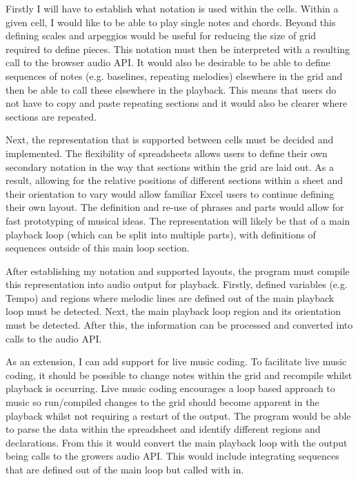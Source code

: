 \documentclass[]{article}
\begin{document}
Firstly I will have to establish what notation is used within the cells.
Within a given cell, I would like to be able to play single notes and
chords. Beyond this defining scales and arpeggios would be useful for
reducing the size of grid required to define pieces. This notation must
then be interpreted with a resulting call to the browser audio API. It
would also be desirable to be able to define sequences of notes (e.g.
baselines, repeating melodies) elsewhere in the grid and then be able to
call these elsewhere in the playback. This means that users do not have
to copy and paste repeating sections and it would also be clearer where
sections are repeated.

Next, the representation that is supported between cells must be decided
and implemented. The flexibility of spreadsheets allows users to define
their own secondary notation in the way that sections within the grid
are laid out. As a result, allowing for the relative positions of
different sections within a sheet and their orientation to vary would
allow familiar Excel users to continue defining their own layout. The
definition and re-use of phrases and parts would allow for fast
prototyping of musical ideas. The representation will likely be that of
a main playback loop (which can be split into multiple parts), with
definitions of sequences outside of this main loop section.

After establishing my notation and supported layouts, the program must
compile this representation into audio output for playback. Firstly,
defined variables (e.g. Tempo) and regions where melodic lines are
defined out of the main playback loop must be detected. Next, the main
playback loop region and its orientation must be detected. After this,
the information can be processed and converted into calls to the audio
API.

As an extension, I can add support for live music coding. To facilitate
live music coding, it should be possible to change notes within the grid
and recompile whilst playback is occurring. Live music coding encourages
a loop based approach to music so run/compiled changes to the grid
should become apparent in the playback whilst not requiring a restart of
the output. The program would be able to parse the data within the
spreadsheet and identify different regions and declarations. From this
it would convert the main playback loop with the output being calls to
the growers audio API. This would include integrating sequences that are
defined out of the main loop but called with in.
\end{document}
